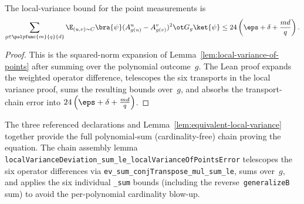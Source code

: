 \begin{lemma}\label{lem:equivalent-local-variance}
	\leanok
	The local-variance bound for the point measurements is
	\begin{equation}
		\sum_{g \in \polyfunc{m}{q}{d}} \E_{(u,v)\sim C} \bra{\psi} (A^u_{g(u)}-A^v_{g(v)})^2 \ot G_g \ket{\psi}
		\le
		24\left(\eps+\delta+\frac{md}{q}\right).
		\label{eq:equivalent-local-variance}
	\end{equation}
\end{lemma}
\begin{proof}
	\leanok
	This is the squared-norm expansion of Lemma~\ref{lem:local-variance-of-points}
	after summing over the polynomial outcome~$g$.  The Lean proof expands the
	weighted operator difference, telescopes the six transports in the local
	variance proof, sums the resulting bounds over~$g$, and absorbs the
	transport-chain error into
	$24\left(\eps+\delta+\frac{md}{q}\right)$.
\end{proof}

\begin{remark}\label{rem:equivalent-local-variance-formalization-inputs}
	The three referenced declarations and Lemma~\ref{lem:equivalent-local-variance} together provide the full polynomial-sum (cardinality-free) chain proving the equation.  The chain assembly lemma \texttt{localVarianceDeviation\_sum\_le\_localVarianceOfPointsError} telescopes the six operator differences via \texttt{ev\_sum\_conjTranspose\_mul\_sum\_le}, sums over~$g$, and applies the six individual \texttt{\_sum} bounds (including the reverse~\texttt{generalizeB} sum) to avoid the per-polynomial cardinality blow-up.
\end{remark}

